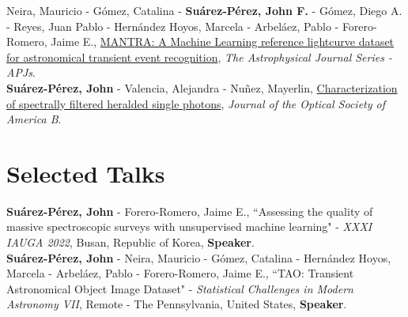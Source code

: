 \documentclass[10pt, a4paper]{article}
\newcommand{\years}[1]{\marginnote{\scriptsize #1}}
\begin{document}
\years{2020}Neira, Mauricio - Gómez, Catalina - \textbf{Suárez-Pérez, John F.} - Gómez, Diego A. - Reyes, Juan Pablo - Hernández Hoyos, Marcela - Arbeláez, Pablo - Forero-Romero, Jaime E., \href{https://iopscience.iop.org/article/10.3847/1538-4365/aba267/pdf}{MANTRA: A Machine Learning reference lightcurve dataset for astronomical transient event recognition}, \emph{The Astrophysical Journal Series - APJs}.
\\

\years{2020}\textbf{Suárez-Pérez, John} - Valencia, Alejandra - Nuñez, Mayerlin, \href{https://doi.org/10.1364/JOSAB.387118}{Characterization of spectrally filtered heralded single photons}, \emph{Journal of the Optical Society of America B}.


\section*{Selected Talks}

\years{2022}\textbf{Suárez-Pérez, John} - Forero-Romero, Jaime E., “Assessing the quality of massive spectroscopic surveys with unsupervised machine learning" - \emph{XXXI IAUGA 2022},  Busan, Republic of Korea, \textbf{Speaker}.\\


\years{2021}\textbf{Suárez-Pérez, John} - Neira, Mauricio - Gómez, Catalina - Hernández Hoyos, Marcela - Arbeláez, Pablo - Forero-Romero, Jaime E., “TAO: Transient Astronomical Object Image Dataset" - \emph{Statistical Challenges in Modern Astronomy VII}, Remote - The Pennsylvania, United States, \textbf{Speaker}.\\ 

\end{document}
